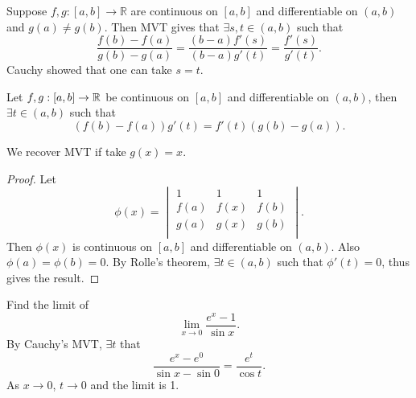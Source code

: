 Suppose $ f,g: [a,b] \to \mathbb{R} $ are continuous on $[a,b]$ and differentiable on $(a,b)$ and $g(a)\neq g(b)$. Then MVT gives that $ \exists s,t\in (a,b) $ such that 
\[
    \frac{f(b)-f(a)}{g(b)-g(a)}=\frac{(b-a)f'(s)}{(b-a)g'(t)}=\frac{f'(s)}{g'(t)}.
\]
Cauchy showed that one can take $s=t$.
\begin{theorem}\label{thm:Cauchy}
    Let $f,g:[a,b]\to {\mathbb{R}}$ be continuous on $[a,b]$ and differentiable on $(a,b)$, then $ \exists t\in (a,b) $ such that 
    \[
        (f(b)-f(a))g'(t)=f'(t)(g(b)-g(a)).
    \]
\end{theorem}
\begin{note}
    We recover MVT if take $g(x)=x$.
\end{note}
\begin{proof}
    Let 
    \[
        \phi(x) = \begin{vmatrix}
            1 & 1 & 1 \\
            f(a) & f(x) & f(b) \\
            g(a) & g(x) & g(b) \\
        \end{vmatrix}.
    \]
    Then $ \phi(x) $ is continuous on $[a,b]$ and differentiable on $(a,b)$. Also $ \phi(a)=\phi(b)=0 $. By Rolle's theorem, $ \exists t\in(a,b) $ such that $ \phi'(t)=0 $, thus gives the result.
\end{proof}
\begin{example}
    Find the limit of 
    \[
        \lim_{x \to 0} \frac{e^x-1}{\sin x}.
    \]
    By Cauchy's MVT, $\exists t$ that
    \[
        \frac{e^x-e^0}{\sin x-\sin 0} = \frac{e^t}{\cos t}.
    \]
    As $x\to 0$, $t\to 0$ and the limit is 1.
\end{example}

